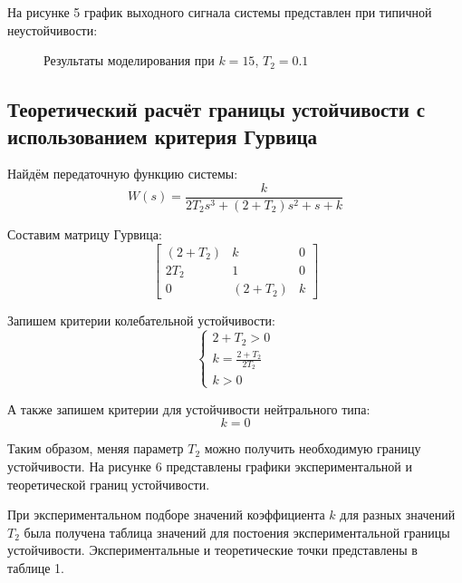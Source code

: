 \documentclass[a4paper, 11pt]{article}
\begin{document}
\newpage
На рисунке 5 график выходного сигнала системы представлен при типичной неустойчивости:
\begin{figure}[h!]
\centering
{}
\caption{Результаты моделирования при $k=15$, $T_2=0.1$}
\end{figure}

\newpage
\begin{center}
\section{Теоретический расчёт границы устойчивости с использованием критерия Гурвица}
\end{center}

Найдём  передаточную функцию системы:
\begin{equation}
W(s)=\frac{k}{2T_2s^3+(2+T_2)s^2+s+k}
\end{equation}
\par
Составим матрицу Гурвица:
\begin{equation}
\begin{bmatrix}
(2+T_2) & k & 0\\
2T_2 & 1 & 0\\
0 & (2+T_2) & k
\end{bmatrix}
\end{equation}

Запишем критерии колебательной устойчивости:
\begin{equation}
\begin{cases}
	2+T_2 > 0 \\
	k = \displaystyle{\frac{2+T_2}{2T_2}} \\
	k > 0
\end{cases}
\end{equation}
\par
А также запишем критерии для устойчивости нейтрального типа:
\begin{equation}
k=0
\end{equation}
\par
Таким образом, меняя параметр $T_2$ можно получить необходимую границу устойчивости.
На рисунке 6 представлены графики экспериментальной и теоретической границ устойчивости. 
\par
При экспериментальном подборе значений коэффициента $k$ для разных значений $T_2$ была получена таблица значений для постоения экспериментальной границы устойчивости. Экспериментальные и теоретические точки представлены в таблице 1.
\end{document}
